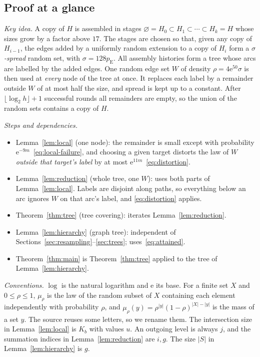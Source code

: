 \documentclass[11pt]{article}
\numberwithin{equation}{section}
\newcommand{\pE}{p_{\mathrm E}}
\newcommand{\ee}{\mathrm e}
\begin{document}
\subsection*{Proof at a glance}

\emph{Key idea.} A copy of $H$ is assembled in stages
$\varnothing=H_0\subset H_1\subset\cdots\subset H_k=H$ whose sizes grow by a
factor above $17$. The stages are chosen so that, given any copy of $H_{i-1}$,
the edges added by a uniformly random extension to a copy of $H_i$ form a
\emph{$\sigma$-spread} random set, with $\sigma=128\pE$. All assembly histories
form a tree whose arcs are labelled by the added edges. One random edge set $W$
of density $\rho=4\ee^{50}\sigma$ is then used at \emph{every} node of the tree
at once. It replaces each label by a remainder outside $W$ of at most half the
size, and spread is kept up to a constant. After $\lfloor\log_2 h\rfloor+1$
successful rounds all remainders are empty, so the union of the random sets
contains a copy of $H$.

\emph{Steps and dependencies.}
\begin{itemize}[leftmargin=1.5em,itemsep=1pt]
\item Lemma~\ref{lem:local} (one node): the remainder is small except with
probability $\ee^{-9m}$~\eqref{eq:local-failure}, and choosing a given target
distorts the law of $W$ \emph{outside that target's label} by at most
$\ee^{11m}$~\eqref{eq:distortion}.
\item Lemma~\ref{lem:reduction} (whole tree, one $W$): uses both parts of
Lemma~\ref{lem:local}. Labels are disjoint along paths, so everything below an
arc ignores $W$ on that arc's label, and \eqref{eq:distortion} applies.
\item Theorem~\ref{thm:tree} (tree covering): iterates
Lemma~\ref{lem:reduction}.
\item Lemma~\ref{lem:hierarchy} (graph tree): independent of
Sections~\ref{sec:resampling}--\ref{sec:trees}; uses~\eqref{eq:attained}.
\item Theorem~\ref{thm:main} is Theorem~\ref{thm:tree} applied to the tree of
Lemma~\ref{lem:hierarchy}.
\end{itemize}

\emph{Conventions.} $\log$ is the natural logarithm and $\ee$ its base. For a
finite set $X$ and $0\le\rho\le1$, $\mu_\rho$ is the law of the random subset of
$X$ containing each element independently with probability $\rho$, and
$\mu_\rho(y)=\rho^{|y|}(1-\rho)^{|X|-|y|}$ is the mass of a set $y$. The source
reuses some letters, so we rename them. The intersection size in
Lemma~\ref{lem:local} is $K_b$ with values $u$. An outgoing level is always
$j$, and the summation indices in Lemma~\ref{lem:reduction} are $i,g$. The size
$|S|$ in Lemma~\ref{lem:hierarchy} is $g$.
\end{document}
